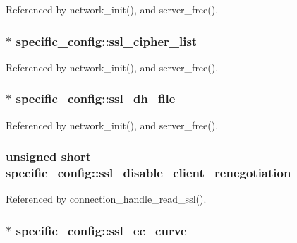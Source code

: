 Referenced by network\-\_\-init(), and server\-\_\-free().

\hypertarget{structspecific__config_a6e765e3d0beaa12ed101cf35fd111071}{
\subsubsection[{ssl\-\_\-cipher\-\_\-list}]{$\ast$ specific\-\_\-config\-::ssl\-\_\-cipher\-\_\-list}}\label{structspecific__config_a6e765e3d0beaa12ed101cf35fd111071}


Referenced by network\-\_\-init(), and server\-\_\-free().

\hypertarget{structspecific__config_aa83b500cff1eb7ab57815cabd2190986}{
\subsubsection[{ssl\-\_\-dh\-\_\-file}]{$\ast$ specific\-\_\-config\-::ssl\-\_\-dh\-\_\-file}}\label{structspecific__config_aa83b500cff1eb7ab57815cabd2190986}


Referenced by network\-\_\-init(), and server\-\_\-free().

\hypertarget{structspecific__config_a3b97c2b605c64a378d4e8febfc43aa74}{
\subsubsection[{ssl\-\_\-disable\-\_\-client\-\_\-renegotiation}]{\setlength{\rightskip}{0pt plus 5cm}unsigned short specific\-\_\-config\-::ssl\-\_\-disable\-\_\-client\-\_\-renegotiation}}\label{structspecific__config_a3b97c2b605c64a378d4e8febfc43aa74}


Referenced by connection\-\_\-handle\-\_\-read\-\_\-ssl().

\hypertarget{structspecific__config_ab4c26faf85636a8fdfb486ffe6fe83cd}{
\subsubsection[{ssl\-\_\-ec\-\_\-curve}]{$\ast$ specific\-\_\-config\-::ssl\-\_\-ec\-\_\-curve}}\label{structspecific__config_ab4c26faf85636a8fdfb486ffe6fe83cd}


